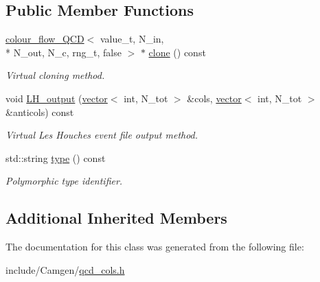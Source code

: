 \subsection*{Public Member Functions}
\begin{DoxyCompactItemize}
\item 
\hypertarget{a00080_a63f9d00551a5c7516457f4c39c15eb22}{\hyperlink{a00079}{colour\-\_\-flow\-\_\-\-Q\-C\-D}$<$ value\-\_\-t, N\-\_\-in, \\*
N\-\_\-out, N\-\_\-c, rng\-\_\-t, false $>$ $\ast$ \hyperlink{a00080_a63f9d00551a5c7516457f4c39c15eb22}{clone} () const }\label{a00080_a63f9d00551a5c7516457f4c39c15eb22}

\begin{DoxyCompactList}\small\item\em Virtual cloning method. \end{DoxyCompactList}\item 
\hypertarget{a00080_a98ffd230962239afa3f83cea329b97f4}{void \hyperlink{a00080_a98ffd230962239afa3f83cea329b97f4}{L\-H\-\_\-output} (\hyperlink{a00559}{vector}$<$ int, N\-\_\-tot $>$ \&cols, \hyperlink{a00559}{vector}$<$ int, N\-\_\-tot $>$ \&anticols) const }\label{a00080_a98ffd230962239afa3f83cea329b97f4}

\begin{DoxyCompactList}\small\item\em Virtual Les Houches event file output method. \end{DoxyCompactList}\item 
\hypertarget{a00080_a16724dc988fa1127b7a8e19cd017e828}{std\-::string \hyperlink{a00080_a16724dc988fa1127b7a8e19cd017e828}{type} () const }\label{a00080_a16724dc988fa1127b7a8e19cd017e828}

\begin{DoxyCompactList}\small\item\em Polymorphic type identifier. \end{DoxyCompactList}\end{DoxyCompactItemize}
\subsection*{Additional Inherited Members}


The documentation for this class was generated from the following file\-:\begin{DoxyCompactItemize}
\item 
include/\-Camgen/\hyperlink{a00724}{qcd\-\_\-cols.\-h}\end{DoxyCompactItemize}
